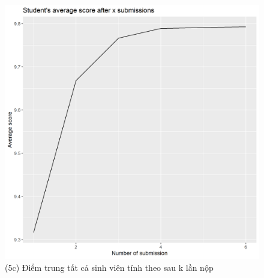 \documentclass[a4paper]{article}
\theoremstyle{definition}
\begin{document}
\begin{figure}[!ht]
    \centering
    \includegraphics[scale=0.4]{Pics/q5c_file3.png}
    \caption{(5c) Điểm trung tất cả sinh viên tính theo sau k lần nộp}
    \label{fig:my_label}
\end{figure}

\newpage
\end{document}
